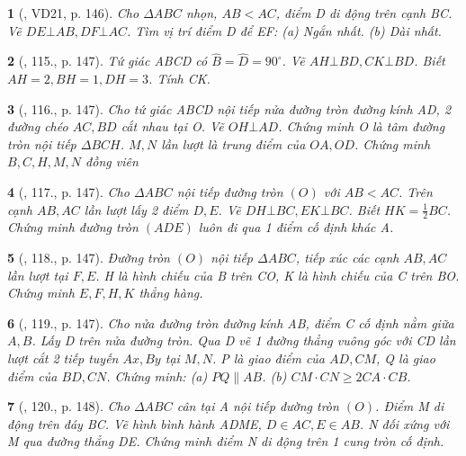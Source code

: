 \documentclass{article}
\newtheorem{baitoan}{}
\begin{document}
\begin{baitoan}[\cite{Tuyen_Toan_9_old}, VD21, p. 146]
	Cho $\Delta ABC$ nhọn, $AB < AC$, điểm D di động trên cạnh BC. Vẽ $DE\bot AB,DF\bot AC$. Tìm vị trí điểm D để EF: (a) Ngắn nhất. (b) Dài nhất.
\end{baitoan}

\begin{baitoan}[\cite{Tuyen_Toan_9_old}, 115., p. 147]
	Tứ giác ABCD có $\widehat{B} = \widehat{D} = 90^\circ$. Vẽ $AH\bot BD,CK\bot BD$. Biết $AH = 2,BH = 1,DH = 3$. Tính CK.
\end{baitoan}

\begin{baitoan}[\cite{Tuyen_Toan_9_old}, 116., p. 147]
	Cho tứ giác ABCD nội tiếp nửa đường tròn đường kính AD, 2 đường chéo $AC,BD$ cắt nhau tại O. Vẽ $OH\bot AD$. Chứng minh O là tâm đường tròn nội tiếp $\Delta BCH$. $M,N$ lần lượt là trung điểm của $OA,OD$. Chứng minh $B,C,H,M,N$ đồng viên
\end{baitoan}

\begin{baitoan}[\cite{Tuyen_Toan_9_old}, 117., p. 147]
	Cho $\Delta ABC$ nội tiếp đường tròn $(O)$ với $AB < AC$. Trên cạnh $AB,AC$ lần lượt lấy 2 điểm $D,E$. Vẽ $DH\bot BC,EK\bot BC$. Biết $HK = \frac{1}{2}BC$. Chứng minh đường tròn $(ADE)$ luôn đi qua 1 điểm cố định khác A.
\end{baitoan}

\begin{baitoan}[\cite{Tuyen_Toan_9_old}, 118., p. 147]
	Đường tròn $(O)$ nội tiếp $\Delta ABC$, tiếp xúc các cạnh $AB,AC$ lần lượt tại $F,E$. H là hình chiếu của B trên CO, K là hình chiếu của C trên BO. Chứng minh $E,F,H,K$ thẳng hàng.
\end{baitoan}

\begin{baitoan}[\cite{Tuyen_Toan_9_old}, 119., p. 147]
	Cho nửa đường tròn đường kính AB, điểm C cố định nằm giữa $A,B$. Lấy D trên nửa đường tròn. Qua D vẽ 1 đường thẳng vuông góc với CD lần lượt cắt 2 tiếp tuyến $Ax,By$ tại $M,N$. P là giao điểm của $AD,CM$, Q là giao điểm của $BD,CN$. Chứng minh: (a) $PQ\parallel AB$. (b) $CM\cdot CN\ge2CA\cdot CB$.
\end{baitoan}

\begin{baitoan}[\cite{Tuyen_Toan_9_old}, 120., p. 148]
	Cho $\Delta ABC$ cân tại A nội tiếp đường tròn $(O)$. Điểm M di động trên đáy BC. Vẽ hình bình hành ADME, $D\in AC,E\in AB$. N đối xứng với M qua đường thẳng DE. Chứng minh điểm N di động trên 1 cung tròn cố định.
\end{baitoan}
\end{document}
